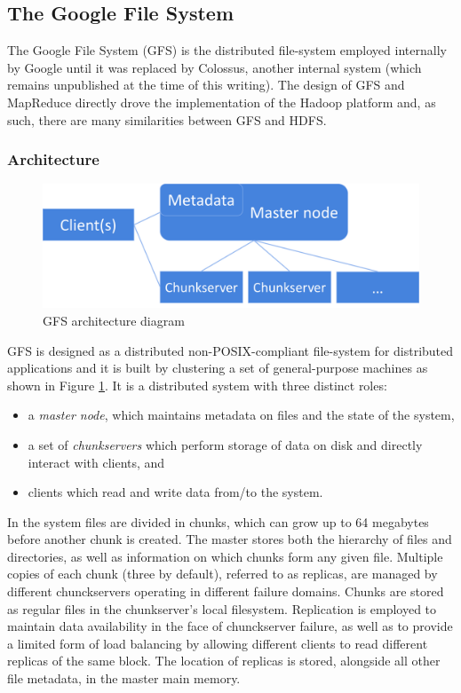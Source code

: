 \subsection{The Google File System}
The Google File System (GFS) \cite{DBLP:conf/sosp/GhemawatGL03} is the distributed file-system employed internally by Google until it was replaced by Colossus, another internal system (which remains unpublished at the time of this writing). 
The design of GFS and MapReduce \cite{DBLP:journals/cacm/DeanG08} directly drove the implementation of the Hadoop platform and, as such, there are many similarities between GFS and HDFS.

\subsubsection{Architecture}
\begin{figure}[h]
\caption{GFS architecture diagram}
\label{fig:gfs-architecture}
\centering
\includegraphics[width=1.0\textwidth]{images/gfs-block-diagram.png}
\end{figure}

GFS is designed as a distributed non-POSIX-compliant file-system for distributed applications and it is built by clustering a set of general-purpose machines as shown in Figure \ref{fig:gfs-architecture}.
It is a distributed system with three distinct roles: 
\begin{itemize}
    \item a \emph{master node}, which maintains metadata on files and the state of the system,
    \item a set of \emph{chunkservers} which perform storage of data on disk and directly interact with clients, and
    \item clients which read and write data from/to the system.
\end{itemize}
In the system files are divided in chunks, which can grow up to 64 megabytes before another chunk is created.
The master stores both the hierarchy of files and directories, as well as information on which chunks form any given file.
Multiple copies of each chunk (three by default), referred to as replicas, are managed by different chunckservers operating in different failure domains.
Chunks are stored as regular files in the chunkserver's local filesystem.
Replication is employed to maintain data availability in the face of chunckserver failure, as well as to provide a limited form of load balancing by allowing different clients to read different replicas of the same block.
The location of replicas is stored, alongside all other file metadata, in the master main memory.

